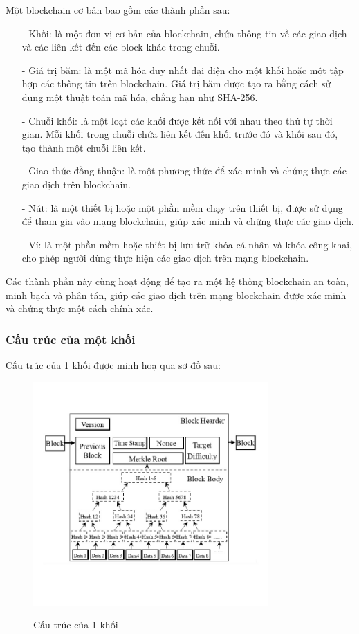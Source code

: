 Một blockchain cơ bản bao gồm các thành phần sau:
\begin{itemize}
    \item[-] Khối: là một đơn vị cơ bản của blockchain, chứa thông tin về các giao dịch và các liên kết đến các block khác trong chuỗi.
    \item[-] Giá trị băm: là một mã hóa duy nhất đại diện cho một khối hoặc một tập hợp các thông tin trên blockchain. Giá trị băm được tạo ra bằng cách sử dụng một thuật toán mã hóa, chẳng hạn như SHA-256.
    \item[-] Chuỗi khối: là một loạt các khối được kết nối với nhau theo thứ tự thời gian. Mỗi khối trong chuỗi chứa liên kết đến khối trước đó và khối sau đó, tạo thành một chuỗi liên kết.
    \item[-] Giao thức đồng thuận: là một phương thức để xác minh và chứng thực các giao dịch trên blockchain. 
    \item[-] Nút: là một thiết bị hoặc một phần mềm chạy trên thiết bị, được sử dụng để tham gia vào mạng blockchain, giúp xác minh và chứng thực các giao dịch.
    \item[-] Ví: là một phần mềm hoặc thiết bị lưu trữ khóa cá nhân và khóa công khai, cho phép người dùng thực hiện các giao dịch trên mạng blockchain.

\end{itemize}

Các thành phần này cùng hoạt động để tạo ra một hệ thống blockchain an toàn, minh bạch và phân tán, giúp các giao dịch trên mạng blockchain được xác minh và chứng thực một cách chính xác.

\subsubsection{Cấu trúc của một khối}


Cấu trúc của 1 khối được minh hoạ qua sơ đồ sau:
\begin{figure}[h]
    \centering
    \includegraphics[width=0.8\textwidth]{images/Cau_truc_khoi.png}
    \label{fig:cau_truc_khoi}
    \caption{Cấu trúc của 1 khối}
\end{figure}

